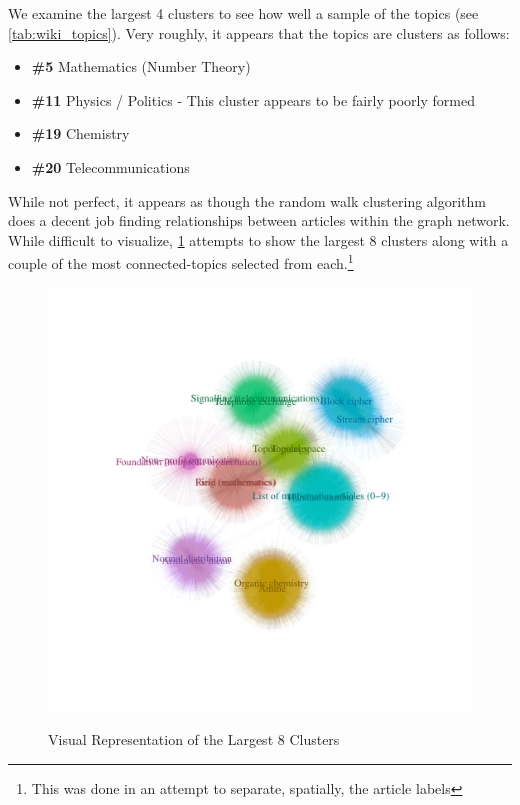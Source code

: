 We examine the largest 4 clusters to see how well a sample of the topics (see \cref{tab:wiki_topics}).  Very roughly, it appears that the topics are clusters as follows:
\begin{itemize}
\item \textbf{\#5} Mathematics (Number Theory)
\item \textbf{\#11} Physics / Politics - This cluster appears to be fairly poorly formed
\item \textbf{\#19} Chemistry
\item \textbf{\#20} Telecommunications
\end{itemize}

While not perfect, it appears as though the random walk clustering algorithm does a decent job finding relationships between articles within the graph network.  While difficult to visualize, \cref{fig:wiki_clust} attempts to show the largest 8 clusters along with a couple of the most connected-topics selected from each.\footnote{This was done in an attempt to separate, spatially, the article labels}

\begin{figure}[!htb]
  \centering
  \caption{Visual Representation of the Largest 8 Clusters}
  \includegraphics[width=\textwidth]{wiki_clust.pdf}
  \label{fig:wiki_clust}
\end{figure}

